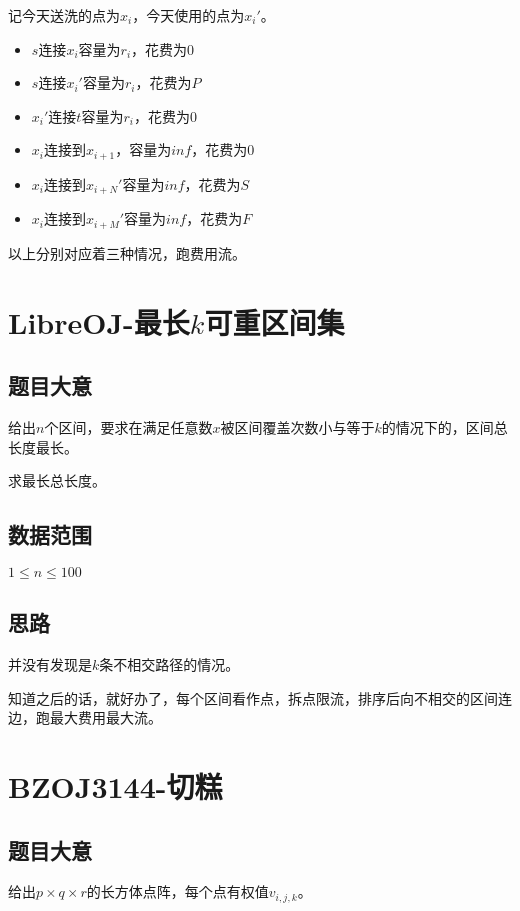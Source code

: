 \documentclass{ctexart}
\numberwithin{equation}{section}
\begin{document}
\begin{flushleft}
  记今天送洗的点为$x_i$，今天使用的点为$x_i'$。
  
  \begin{itemize}
  \item $s$连接$x_i$容量为$r_i$，花费为$0$
  \item $s$连接$x_i'$容量为$r_i$，花费为$P$
  \item $x_i'$连接$t$容量为$r_i$，花费为$0$
  \item $x_i$连接到$x_{i+1}$，容量为$inf$，花费为$0$
  \item $x_i$连接到$x_{i+N}'$容量为$inf$，花费为$S$
  \item $x_i$连接到$x_{i+M}'$容量为$inf$，花费为$F$
  \end{itemize}
  
  以上分别对应着三种情况，跑费用流。
    
  \newpage

  \section{LibreOJ-最长$k$可重区间集}
  \subsection{题目大意}
  给出$n$个区间，要求在满足任意数$x$被区间覆盖次数小与等于$k$的情况下的，区间总长度最长。

  求最长总长度。
  
  \subsection{数据范围}
  $1\le n \le 100$
  \subsection{思路}
  并没有发现是$k$条不相交路径的情况。

  知道之后的话，就好办了，每个区间看作点，拆点限流，排序后向不相交的区间连边，跑最大费用最大流。
    
  \newpage

  \section{BZOJ3144-切糕}
  \subsection{题目大意}
  给出$p\times q\times r$的长方体点阵，每个点有权值$v_{i,j,k}$。


\end{flushleft}
\end{document}

